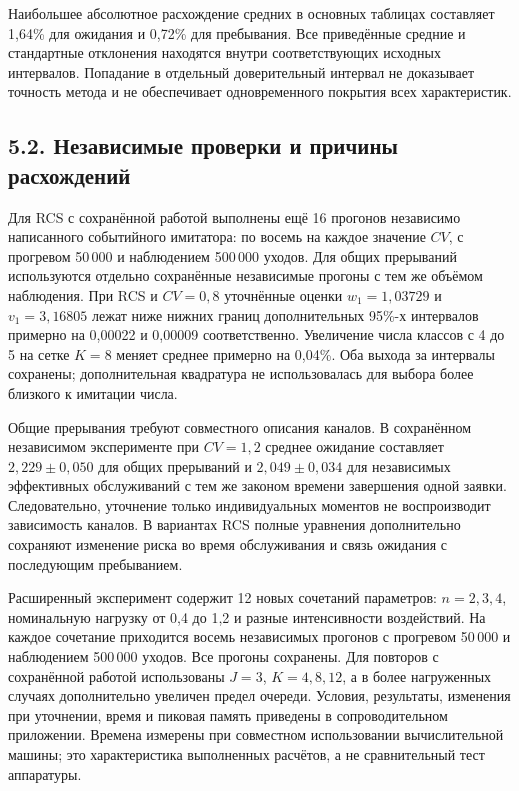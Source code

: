 Наибольшее абсолютное расхождение средних в основных таблицах составляет 1,64\% для ожидания и 0,72\% для пребывания. Все приведённые средние и стандартные отклонения находятся внутри соответствующих исходных интервалов. Попадание в отдельный доверительный интервал не доказывает точность метода и не обеспечивает одновременного покрытия всех характеристик.

\subsection*{5.2. Независимые проверки и причины расхождений}
Для RCS с сохранённой работой выполнены ещё 16 прогонов независимо написанного событийного имитатора: по восемь на каждое значение \(CV\), с прогревом 50\,000 и наблюдением 500\,000 уходов. Для общих прерываний используются отдельно сохранённые независимые прогоны с тем же объёмом наблюдения. При RCS и \(CV=0{,}8\) уточнённые оценки \(w_1=1{,}03729\) и \(v_1=3{,}16805\) лежат ниже нижних границ дополнительных 95\%-х интервалов примерно на 0{,}00022 и 0{,}00009 соответственно. Увеличение числа классов с 4 до 5 на сетке \(K=8\) меняет среднее примерно на 0{,}04\%. Оба выхода за интервалы сохранены; дополнительная квадратура не использовалась для выбора более близкого к имитации числа.

Общие прерывания требуют совместного описания каналов. В сохранённом независимом эксперименте при \(CV=1{,}2\) среднее ожидание составляет \(2{,}229\pm0{,}050\) для общих прерываний и \(2{,}049\pm0{,}034\) для независимых эффективных обслуживаний с тем же законом времени завершения одной заявки. Следовательно, уточнение только индивидуальных моментов не воспроизводит зависимость каналов. В вариантах RCS полные уравнения дополнительно сохраняют изменение риска во время обслуживания и связь ожидания с последующим пребыванием.

Расширенный эксперимент содержит 12 новых сочетаний параметров: \(n=2,3,4\), номинальную нагрузку от 0{,}4 до 1{,}2 и разные интенсивности воздействий. На каждое сочетание приходится восемь независимых прогонов с прогревом 50\,000 и наблюдением 500\,000 уходов. Все прогоны сохранены. Для повторов с сохранённой работой использованы \(J=3\), \(K=4,8,12\), а в более нагруженных случаях дополнительно увеличен предел очереди. Условия, результаты, изменения при уточнении, время и пиковая память приведены в сопроводительном приложении. Времена измерены при совместном использовании вычислительной машины; это характеристика выполненных расчётов, а не сравнительный тест аппаратуры.

